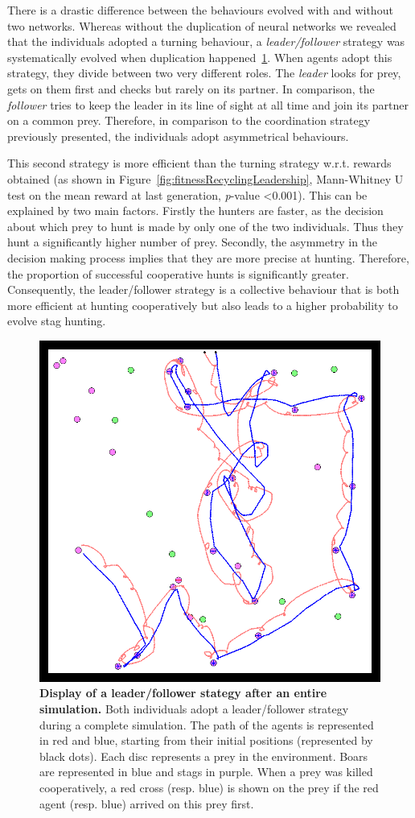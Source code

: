     There is a drastic difference between the behaviours evolved with and without two networks. Whereas without the duplication of neural networks we revealed that the individuals adopted a turning behaviour, a \emph{leader/follower} strategy was systematically evolved when duplication happened~\ref{fig:figLeadershipBehaviour}. When agents adopt this strategy, they divide between two very different roles. The \emph{leader} looks for prey, gets on them first and checks but rarely on its partner. In comparison, the \emph{follower} tries to keep the leader in its line of sight at all time and join its partner on a common prey. Therefore, in comparison to the coordination strategy previously presented, the individuals adopt asymmetrical behaviours. 

    This second strategy is more efficient than the turning strategy w.r.t. rewards obtained (as shown in Figure~\ref{fig:fitnessRecyclingLeadership}, Mann-Whitney U test on the mean reward at last generation, {\em p}-value \textless 0.001). This can be explained by two main factors. Firstly the hunters are faster, as the decision about which prey to hunt is made by only one of the two individuals. Thus they hunt a significantly higher number of prey. Secondly, the asymmetry in the decision making process implies that they are more precise at hunting. Therefore, the proportion of successful cooperative hunts is significantly greater. Consequently, the leader/follower strategy is a collective behaviour that is both more efficient at hunting cooperatively but also leads to a higher probability to evolve stag hunting.

    \begin{figure}[h]
      \centering
        \includegraphics[width=0.5\linewidth]{fig/ArticleBio2/Fig5.png}
        \caption{\textbf{Display of a leader/follower stategy after an entire simulation.}
        Both individuals adopt a leader/follower strategy during a complete simulation. The path of the agents is represented in red and blue, starting from their initial positions (represented by black dots). Each disc represents a prey in the environment. Boars are represented in blue and stags in purple. When a prey was killed cooperatively, a red cross (resp. blue) is shown on the prey if the red agent (resp. blue) arrived on this prey first.}
      \label{fig:figLeadershipBehaviour}
    \end{figure}

